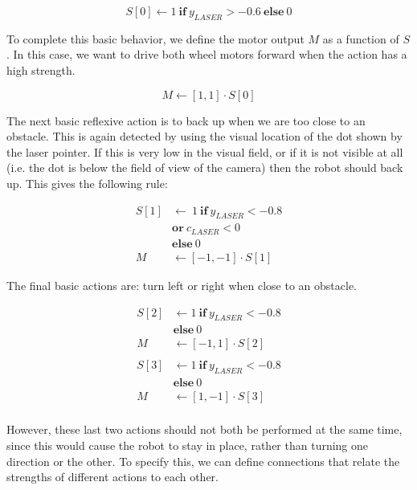 \documentclass[conference]{IEEEtran}
\begin{document}
\begin{equation}
	S[0] \leftarrow 1 \: \mathrm{\mathbf{if}} \: y_{LASER} > -0.6 \: \mathrm{\mathbf{else}} \: 0
\end{equation}

To complete this basic behavior, we define the motor output $M$ as a 
function of $S$. In this case, we want to drive both wheel motors forward 
when the action has a high strength.

\begin{equation}
	M \leftarrow [1, 1] \cdot S[0]
\end{equation}

The next basic reflexive action is to back up when we are too close to an 
obstacle. This is again detected by using the visual location of the dot
shown by the laser pointer.  If this is very low in the visual field, or if
it is not visible at all (i.e. the dot is below the field of view of the camera)
then the robot should back up.  This gives the following rule:

\begin{equation}
\begin{split}
	S[1] & \leftarrow \: 1 \: \mathrm{\mathbf{if}} \: y_{LASER} < -0.8 \\ 
	& \mathrm{\mathbf{or}} \: c_{LASER} < 0 \\ 
	& \mathrm{\mathbf{else}} \: 0 \\
	M & \leftarrow [-1, -1] \cdot S[1]
\end{split}
\end{equation}


The final basic actions are: turn left or right when close to an obstacle. 

\begin{equation}
\begin{split}
	S[2] & \leftarrow 1 \: \mathrm{\mathbf{if}} \: y_{LASER} < -0.8 \\ 
	& \mathrm{\mathbf{else}} \: 0 \\
	M & \leftarrow [-1, 1] \cdot S[2] \\ 
	\\
	S[3] & \leftarrow 1 \: \mathrm{\mathbf{if}} \: y_{LASER} < -0.8 \\ 		    & \mathrm{\mathbf{else}} \: 0 \\
	M & \leftarrow [1, -1] \cdot S[3] \\
\end{split}
\end{equation}

However, these last two actions should not both be performed at the same time,
since this would cause the robot to stay in place, rather than turning one
direction or the other. To specify this, we can define connections that relate 
the strengths of different actions to each other.
\end{document}
